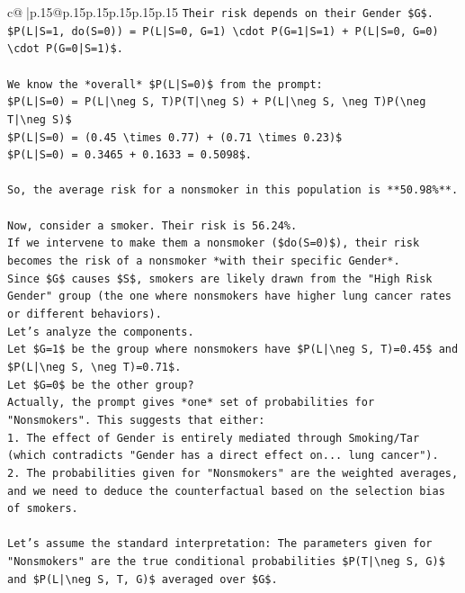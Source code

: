 \documentclass{article}
\begin{document}
{\begin{supertabular}{c@{$\;$}|p{.15\linewidth}@{}p{.15\linewidth}p{.15\linewidth}p{.15\linewidth}p{.15\linewidth}p{.15\linewidth}}
{{{\texttt{Their risk depends on their Gender \$G\$.} \\
\texttt{\$P(L|S=1, do(S=0)) = P(L|S=0, G=1) \textbackslash{}cdot P(G=1|S=1) + P(L|S=0, G=0) \textbackslash{}cdot P(G=0|S=1)\$.} \\
\\ 
\texttt{We know the *overall* \$P(L|S=0)\$ from the prompt:} \\
\texttt{\$P(L|S=0) = P(L|\textbackslash{}neg S, T)P(T|\textbackslash{}neg S) + P(L|\textbackslash{}neg S, \textbackslash{}neg T)P(\textbackslash{}neg T|\textbackslash{}neg S)\$} \\
\texttt{\$P(L|S=0) = (0.45 \textbackslash{}times 0.77) + (0.71 \textbackslash{}times 0.23)\$} \\
\texttt{\$P(L|S=0) = 0.3465 + 0.1633 = 0.5098\$.} \\
\\ 
\texttt{So, the average risk for a nonsmoker in this population is **50.98\%**.} \\
\\ 
\texttt{Now, consider a smoker. Their risk is 56.24\%.} \\
\texttt{If we intervene to make them a nonsmoker (\$do(S=0)\$), their risk becomes the risk of a nonsmoker *with their specific Gender*.} \\
\texttt{Since \$G\$ causes \$S\$, smokers are likely drawn from the "High Risk Gender" group (the one where nonsmokers have higher lung cancer rates or different behaviors).} \\
\texttt{Let's analyze the components.} \\
\texttt{Let \$G=1\$ be the group where nonsmokers have \$P(L|\textbackslash{}neg S, T)=0.45\$ and \$P(L|\textbackslash{}neg S, \textbackslash{}neg T)=0.71\$.} \\
\texttt{Let \$G=0\$ be the other group?} \\
\texttt{Actually, the prompt gives *one* set of probabilities for "Nonsmokers". This suggests that either:} \\
\texttt{1.  The effect of Gender is entirely mediated through Smoking/Tar (which contradicts "Gender has a direct effect on... lung cancer").} \\
\texttt{2.  The probabilities given for "Nonsmokers" are the weighted averages, and we need to deduce the counterfactual based on the selection bias of smokers.} \\
\\ 
\texttt{Let's assume the standard interpretation: The parameters given for "Nonsmokers" are the true conditional probabilities \$P(T|\textbackslash{}neg S, G)\$ and \$P(L|\textbackslash{}neg S, T, G)\$ averaged over \$G\$.} \\
}}}
\end{supertabular}}
\end{document}
